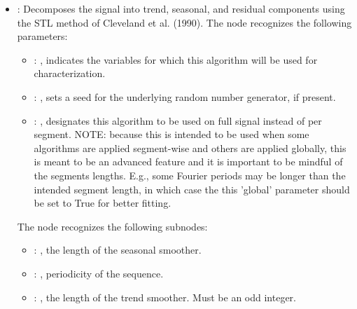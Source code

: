 \begin{itemize}
    \item {}:
       Decomposes the signal into trend, seasonal, and residual components using the STL method of
      Cleveland et al. (1990).
      The  node recognizes the following parameters:
        \begin{itemize}
          \item {}: ,
            indicates the variables for which this algorithm will be used for characterization.
          \item {}: ,
            sets a seed for the underlying random number generator, if present.
          \item {}: ,
            designates this algorithm to be used on full signal instead of per
            segment. NOTE: because this is intended to be used when some algorithms are
            applied segment-wise and others are applied globally, this is meant to be an
            advanced feature and it is important to be mindful of the segments lengths.
            E.g., some Fourier periods may be longer than the intended segment length, in
            which case the this 'global' parameter should be set to True for better
            fitting. 
      \end{itemize}

      The  node recognizes the following subnodes:
      \begin{itemize}
        \item {}: ,
          the length of the seasonal smoother.

        \item {}: ,
          periodicity of the sequence.

        \item {}: ,
          the length of the trend smoother. Must be an odd integer.
      \end{itemize}


\end{itemize}
